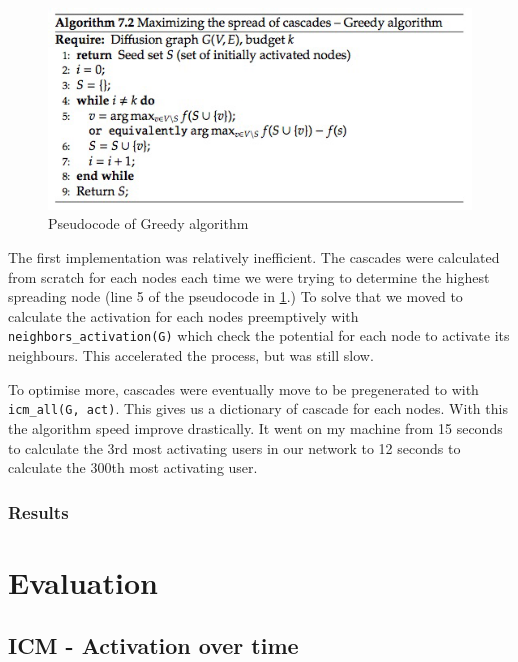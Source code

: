 \begin{figure}[H]
    \centering
    \includegraphics{Report/images/greedy_pseudo.png}
    \caption{Pseudocode of Greedy algorithm}
    \label{fig:my_label}
\end{figure}

The first implementation was relatively inefficient. The cascades were calculated from scratch for each nodes each time we were trying to determine the highest spreading node (line 5 of the pseudocode in \ref{fig:my_label}.)
To solve that we moved to calculate the activation for each nodes preemptively with \texttt{neighbors\_activation(G)} which check the potential for each node to activate its neighbours.
This accelerated the process, but was still slow. 

To optimise more, cascades were eventually move to be pregenerated to with \texttt{icm\_all(G, act)}. This gives us a dictionary of cascade for each nodes. With this the algorithm speed improve drastically. It went on my machine from 15 seconds to calculate the 3rd most activating users in our network to 12 seconds to calculate the 300th most activating user. 
\begin{figure}

\end{figure}

\subsubsection{Results}

\section{Evaluation}

\subsection{ICM - Activation over time}
